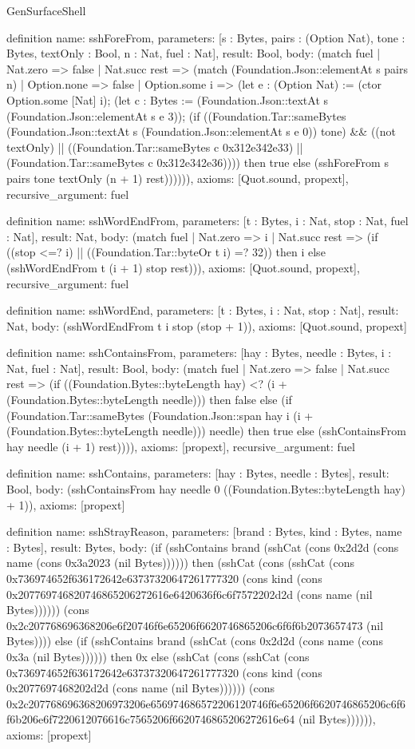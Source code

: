 \begin{lexlean}{GenSurfaceShell}
\begin{semanticmodule}
definition{
  name: sshForeFrom,
  parameters: [s : Bytes, pairs : (Option Nat), tone : Bytes, textOnly : Bool, n : Nat, fuel : Nat],
  result: Bool,
  body: (match fuel
    | Nat.zero => false
    | Nat.succ rest => (match (Foundation.Json::elementAt s pairs n)
      | Option.none => false
      | Option.some i => (let e : (Option Nat) := (ctor Option.some [Nat] i); (let c : Bytes := (Foundation.Json::textAt s (Foundation.Json::elementAt s e 3)); (if ((Foundation.Tar::sameBytes (Foundation.Json::textAt s (Foundation.Json::elementAt s e 0)) tone) && ((not textOnly) || ((Foundation.Tar::sameBytes c 0x312e342e33) || (Foundation.Tar::sameBytes c 0x312e342e36)))) then true else (sshForeFrom s pairs tone textOnly (n + 1) rest)))))),
  axioms: [Quot.sound, propext],
  recursive_argument: fuel
}

definition{
  name: sshWordEndFrom,
  parameters: [t : Bytes, i : Nat, stop : Nat, fuel : Nat],
  result: Nat,
  body: (match fuel
    | Nat.zero => i
    | Nat.succ rest => (if ((stop <=? i) || ((Foundation.Tar::byteOr t i) =? 32)) then i else (sshWordEndFrom t (i + 1) stop rest))),
  axioms: [Quot.sound, propext],
  recursive_argument: fuel
}

definition{
  name: sshWordEnd,
  parameters: [t : Bytes, i : Nat, stop : Nat],
  result: Nat,
  body: (sshWordEndFrom t i stop (stop + 1)),
  axioms: [Quot.sound, propext]
}

definition{
  name: sshContainsFrom,
  parameters: [hay : Bytes, needle : Bytes, i : Nat, fuel : Nat],
  result: Bool,
  body: (match fuel
    | Nat.zero => false
    | Nat.succ rest => (if ((Foundation.Bytes::byteLength hay) <? (i + (Foundation.Bytes::byteLength needle))) then false else (if (Foundation.Tar::sameBytes (Foundation.Json::span hay i (i + (Foundation.Bytes::byteLength needle))) needle) then true else (sshContainsFrom hay needle (i + 1) rest)))),
  axioms: [propext],
  recursive_argument: fuel
}

definition{
  name: sshContains,
  parameters: [hay : Bytes, needle : Bytes],
  result: Bool,
  body: (sshContainsFrom hay needle 0 ((Foundation.Bytes::byteLength hay) + 1)),
  axioms: [propext]
}

definition{
  name: sshStrayReason,
  parameters: [brand : Bytes, kind : Bytes, name : Bytes],
  result: Bytes,
  body: (if (sshContains brand (sshCat (cons 0x2d2d (cons name (cons 0x3a2023 (nil Bytes)))))) then (sshCat (cons (sshCat (cons 0x736974652f636172642e63737320647261777320 (cons kind (cons 0x207769746820746865206272616e6420636f6c6f7572202d2d (cons name (nil Bytes)))))) (cons 0x2c207768696368206e6f20746f6e65206f6620746865206c6f6f6b2073657473 (nil Bytes)))) else (if (sshContains brand (sshCat (cons 0x2d2d (cons name (cons 0x3a (nil Bytes)))))) then 0x else (sshCat (cons (sshCat (cons 0x736974652f636172642e63737320647261777320 (cons kind (cons 0x2077697468202d2d (cons name (nil Bytes)))))) (cons 0x2c207768696368206973206e656974686572206120746f6e65206f6620746865206c6f6f6b206e6f7220612076616c7565206f6620746865206272616e64 (nil Bytes)))))),
  axioms: [propext]
}


\end{semanticmodule}
\end{lexlean}
